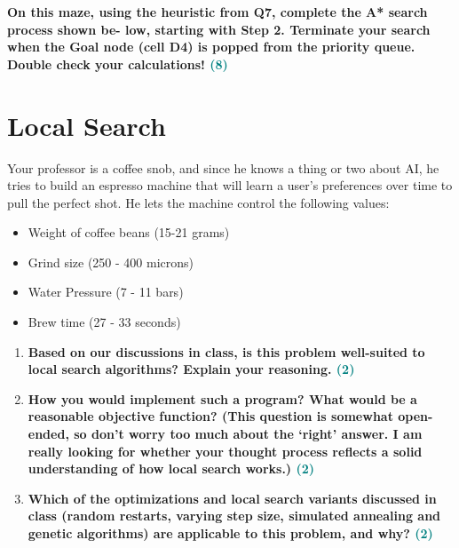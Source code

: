 \documentclass[a4paper]{article}
\begin{document}
\begin{sloppypar}
\begin{enumerate}[start=6,label=Q\arabic*,left=0pt]
    \textbf{On this maze, using the heuristic from Q7, complete the A* search process shown be- low, starting with Step 2. Terminate your search when the Goal node (cell D4) is popped from the priority queue. Double check your calculations! \hfill \textcolor{teal}{(8)}}
    
    \par

\end{enumerate}

\section{Local Search}

Your professor is a coffee snob, and since he knows a thing or two about AI, he tries to
build an espresso machine that will learn a user’s preferences over time to pull the perfect
shot. He lets the machine control the following values:

\begin{itemize}
    \item Weight of coffee beans (15-21 grams)
    \item Grind size (250 - 400 microns)
    \item Water Pressure (7 - 11 bars)
    \item Brew time (27 - 33 seconds)
\end{itemize}

\begin{enumerate}[start=9,label=Q\arabic*,left=0pt]
    \item \textbf{Based on our discussions in class, is this problem well-suited to local search algorithms? Explain your reasoning. \hfill \textcolor{teal}{(2)}}
    
    \par 
    
    \item \textbf{How you would implement such a program? What would be a reasonable objective function? (This question is somewhat open-ended, so don’t worry too much about the ‘right’ answer. I am really looking for whether your thought process reflects a solid understanding of how local search works.) \hfill \textcolor{teal}{(2)}}
    
    \par

    \item \textbf{Which of the optimizations and local search variants discussed in class (random restarts, varying step size, simulated annealing and genetic algorithms) are applicable to this problem, and why? \hfill \textcolor{teal}{(2)}}
    

\end{enumerate}
\end{sloppypar}
\end{document}
